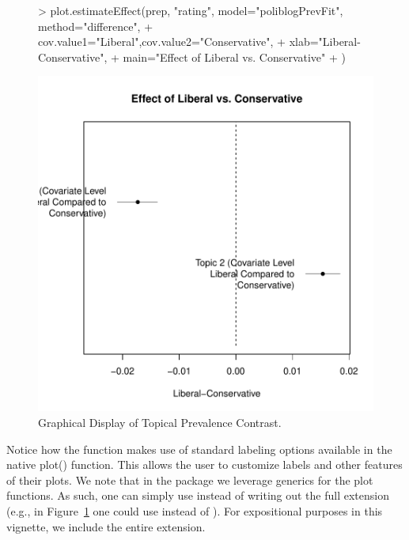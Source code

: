 \documentclass[nojss]{jss}
\begin{document}
\begin{figure}[t!]
\begin{center}
\begin{Schunk}
\begin{Sinput}
> plot.estimateEffect(prep, "rating", model="poliblogPrevFit", method="difference",
+             cov.value1="Liberal",cov.value2="Conservative",
+            xlab="Liberal-Conservative",
+            main="Effect of Liberal vs. Conservative"
+            )
\end{Sinput}
\end{Schunk}
\includegraphics{stmVignette-014}
\caption{Graphical Display of Topical Prevalence Contrast.}
\label{fig:difference}
\end{center}
\end{figure}


Notice how the function makes use of standard labeling options available in the native plot() function. This allows the user to customize labels and other features of their plots. We note that in the package we leverage generics for the plot functions. As such, one can simply use  instead of writing out the full extension (e.g., in Figure~\ref{fig:difference} one could use  instead of ). For expositional purposes in this vignette, we include the entire extension.
\end{document}
